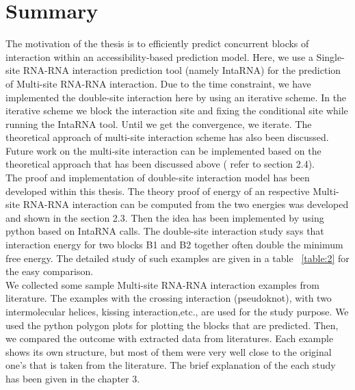 \documentclass[twoside,a4paper]{report}
\numberwithin{equation}{section}
\begin{document}
		\chapter{Summary}
		
	The motivation of the thesis is to efficiently predict concurrent blocks of interaction within an accessibility-based prediction model. Here, we use a Single-site RNA-RNA interaction prediction tool (namely IntaRNA) for the prediction of Multi-site RNA-RNA interaction. Due to the time constraint, we have implemented the double-site interaction here by using an iterative scheme. In the iterative scheme we block the interaction site and fixing the conditional site while running the IntaRNA tool. Until we get the convergence, we iterate. The theoretical approach of multi-site interaction scheme has also been discussed. Future work on the multi-site interaction can be implemented based on the theoretical approach that has been discussed above ( refer to section 2.4). \\
	
	 The proof and implementation of double-site interaction model has been developed within this thesis. The theory proof of energy of an respective Multi-site RNA-RNA interaction can be computed from the two energies was developed and shown in the section 2.3. Then the idea has been implemented by using python based on IntaRNA calls. The double-site interaction study says that interaction energy for two blocks B1 and B2 together often double the minimum free energy. The detailed study of such examples are given in a table ~\ref{table:2} for the easy comparison. \\
	 
	  We collected some sample Multi-site RNA-RNA interaction examples from literature. The examples with the crossing interaction (pseudoknot), with two intermolecular helices, kissing interaction,etc., are used for the study purpose. We used the python polygon plots for plotting the blocks that are predicted. Then, we compared the outcome with extracted data from literatures. Each example shows its own structure, but most of them were very well close to the original one's that is taken from the literature. The brief explanation of the each study has been given in the chapter 3. \\ 
	  
	  
	
	
	
\end{document}
